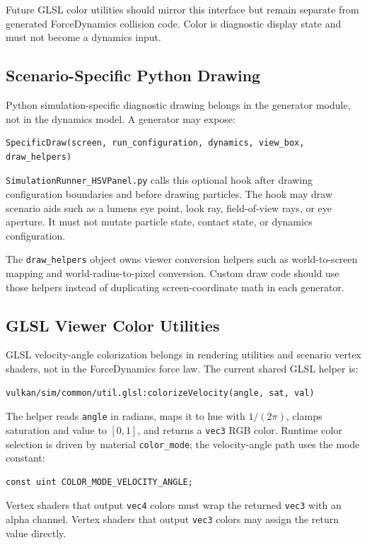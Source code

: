 Future GLSL color utilities should mirror this interface but remain separate
from generated ForceDynamics collision code.  Color is diagnostic display
state and must not become a dynamics input.

\subsection{Scenario-Specific Python Drawing}

Python simulation-specific diagnostic drawing belongs in the generator module,
not in the dynamics model.  A generator may expose:
\begin{verbatim}
SpecificDraw(screen, run_configuration, dynamics, view_box, draw_helpers)
\end{verbatim}

\texttt{SimulationRunner\_HSVPanel.py} calls this optional hook after drawing
configuration boundaries and before drawing particles.  The hook may draw
scenario aids such as a lumens eye point, look ray, field-of-view rays, or eye
aperture.  It must not mutate particle state, contact state, or dynamics
configuration.

The \texttt{draw\_helpers} object owns viewer conversion helpers such as
world-to-screen mapping and world-radius-to-pixel conversion.  Custom draw
code should use those helpers instead of duplicating screen-coordinate math in
each generator.

\subsection{GLSL Viewer Color Utilities}

GLSL velocity-angle colorization belongs in rendering utilities and scenario
vertex shaders, not in the ForceDynamics force law.  The current shared GLSL
helper is:
\begin{verbatim}
vulkan/sim/common/util.glsl:colorizeVelocity(angle, sat, val)
\end{verbatim}

The helper reads \texttt{angle} in radians, maps it to hue with
\(1/(2\pi)\), clamps saturation and value to \([0,1]\), and returns a
\texttt{vec3} RGB color.  Runtime color selection is driven by material
\texttt{color\_mode}; the velocity-angle path uses the mode constant:
\begin{verbatim}
const uint COLOR_MODE_VELOCITY_ANGLE;
\end{verbatim}

Vertex shaders that output \texttt{vec4} colors must wrap the returned
\texttt{vec3} with an alpha channel.  Vertex shaders that output
\texttt{vec3} colors may assign the return value directly.
